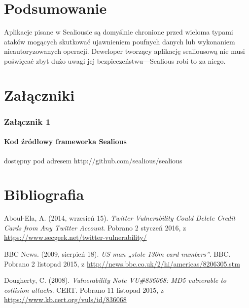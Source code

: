 \documentclass[12pt,polish,a4paper,]{report}
\begin{document}
\chapter*{Podsumowanie}\label{podsumowanie}

Aplikacje pisane w Sealiousie są domyślnie chronione przed wieloma
typami ataków mogących skutkować ujawnieniem poufnych danych lub
wykonaniem nieautoryzowanych operacji. Deweloper tworzący aplikację
sealiousową nie musi poświęcać zbyt dużo uwagi jej
bezpieczeństwu---Sealious robi to za niego.

\chapter*{Załączniki}\label{zaux142ux105czniki}

\subsection{Załącznik 1}\label{zaux142ux105cznik-1}

\subsubsection{Kod źródłowy frameworka
Sealious}\label{kod-ux17aruxf3dux142owy-frameworka-sealious}

dostępny pod adresem http://github.com/sealious/sealious

\chapter*{Bibliografia}\label{bibliografia}

\hypertarget{refs}{}
\hypertarget{ref-twitterux5fidor}{}
Aboul-Ela, A. (2014, wrzesień 15). \emph{Twitter Vulnerability Could
Delete Credit Cards from Any Twitter Account}. Pobrano 2 styczeń 2016, z
\url{https://www.secgeek.net/twitter-vulnerability/}

\hypertarget{ref-130mux5fcards}{}
BBC News. (2009, sierpień 18). \emph{US man „stole 130m card numbers''}.
BBC. Pobrano 2 listopad 2015, z
\url{http://news.bbc.co.uk/2/hi/americas/8206305.stm}

\hypertarget{ref-md5ux5fnotux5fsuitable}{}
Dougherty, C. (2008). \emph{Vulnerability Note VU\#836068: MD5
vulnerable to collision attacks}. CERT. Pobrano 11 listopad 2015, z
\url{https://www.kb.cert.org/vuls/id/836068}
\end{document}
